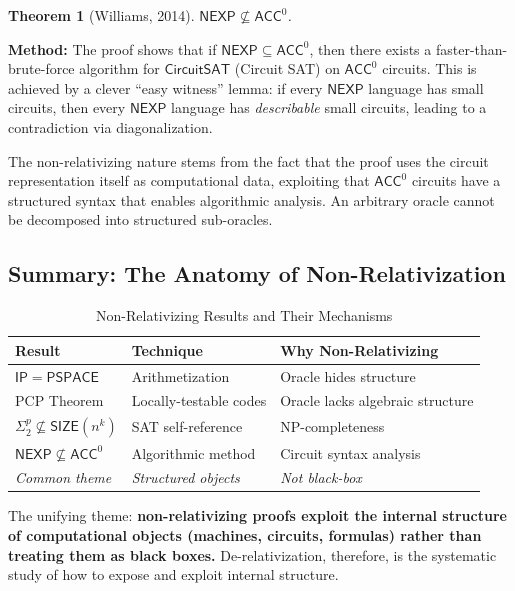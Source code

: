 \documentclass[11pt,a4paper]{article}
\theoremstyle{plain}
\newtheorem{theorem}{Theorem}[section]
\theoremstyle{definition}
\theoremstyle{remark}
\newcommand{\PSPACE}{\mathsf{PSPACE}}
\newcommand{\NEXP}{\mathsf{NEXP}}
\newcommand{\IP}{\mathsf{IP}}
\newcommand{\ACC}{\mathsf{ACC}}
\newcommand{\SIZE}{\mathsf{SIZE}}
\newcommand{\CKT}{\mathsf{CircuitSAT}}
\begin{document}
\begin{theorem}[Williams, 2014]
$\NEXP \not\subseteq \ACC^0$.
\end{theorem}

\noindent\textbf{Method:} The proof shows that if $\NEXP \subseteq \ACC^0$, then
there exists a faster-than-brute-force algorithm for $\CKT$ (Circuit SAT) on
$\ACC^0$ circuits.  This is achieved by a clever ``easy witness'' lemma: if
every $\NEXP$ language has small circuits, then every $\NEXP$ language has
\emph{describable} small circuits, leading to a contradiction via
diagonalization.

The non-relativizing nature stems from the fact that the proof uses the circuit
representation itself as computational data, exploiting that $\ACC^0$ circuits
have a structured syntax that enables algorithmic analysis.  An arbitrary oracle
cannot be decomposed into structured sub-oracles.

\subsection{Summary: The Anatomy of Non-Relativization}

\begin{table}[H]
\centering
\caption{Non-Relativizing Results and Their Mechanisms}
\label{tab:nonrel}
\begin{tabular}{@{}lll@{}}
\toprule
\textbf{Result} & \textbf{Technique} & \textbf{Why Non-Relativizing} \\
\midrule
$\IP = \PSPACE$ & Arithmetization & Oracle hides structure \\
PCP Theorem     & Locally-testable codes & Oracle lacks algebraic structure \\
$\Sigma_2^p \not\subseteq \SIZE(n^k)$ & SAT self-reference & NP-completeness \\
$\NEXP \not\subseteq \ACC^0$ & Algorithmic method & Circuit syntax analysis \\
\midrule
\emph{Common theme} & \emph{Structured objects} & \emph{Not black-box} \\
\bottomrule
\end{tabular}
\end{table}

The unifying theme: \textbf{non-relativizing proofs exploit the internal
structure of computational objects (machines, circuits, formulas) rather than
treating them as black boxes.}  De-relativization, therefore, is the systematic
study of how to expose and exploit internal structure.
\end{document}
